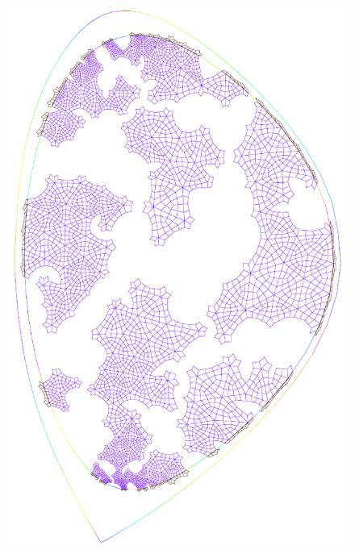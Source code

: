\begin{figure}
{\includegraphics[scale=.5]{images/tokamak_layer_mesh_adapt_fine_1_pre.pdf}}\quad
\subfigure[{rank = 2}\label{fig:tokamak_layer_mesh_adapt_fine_2_pre}]

\end{figure}

